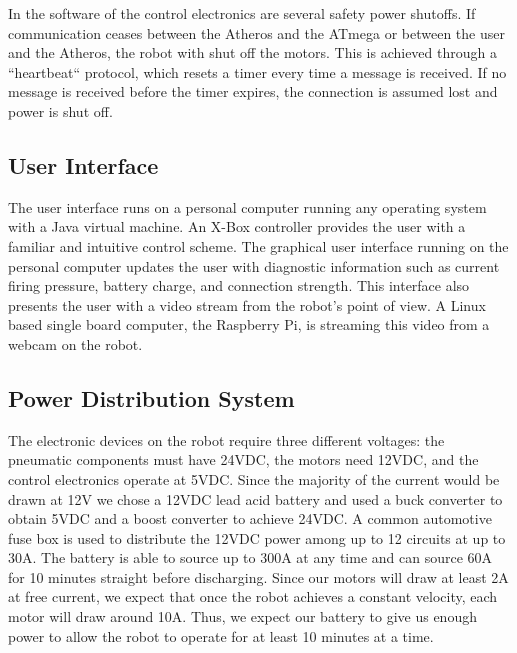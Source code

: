 \documentclass[letterpaper,12pt]{article}
\begin{document}
In the software of the control electronics are several safety power shutoffs. If communication ceases between the Atheros and the ATmega or between the user and the Atheros, the robot with shut off the motors. This is achieved through a “heartbeat“ protocol, which resets a timer every time a message is received. If no message is received before the timer expires, the connection is assumed lost and power is shut off.\\

\subsection{User Interface}
The user interface runs on a personal computer running any operating system with a Java virtual machine. An X-Box controller provides the user with a familiar and intuitive control scheme. The graphical user interface running on the personal computer updates the user with diagnostic information such as current firing pressure, battery charge, and connection strength. This interface also presents the user with a video stream from the robot’s point of view. A Linux based single board computer, the Raspberry Pi, is streaming this video from a webcam on the robot.\\

\subsection{Power Distribution System}
The electronic devices on the robot require three different voltages: the pneumatic components must have 24VDC, the motors need 12VDC, and the control electronics operate at 5VDC. Since the majority of the current would be drawn at 12V we chose a 12VDC lead acid battery and used a buck converter to obtain 5VDC and a boost converter to achieve 24VDC. A common automotive fuse box is used to distribute the 12VDC power among up to 12 circuits at up to 30A. The battery is able to source up to 300A at any time and can source 60A for 10 minutes straight before discharging. Since our motors will draw at least 2A at free current, we expect that once the robot achieves a constant velocity, each motor will draw around 10A. Thus, we expect our battery to give us enough power to allow the robot to operate for at least 10 minutes at a time.\\
\end{document}
